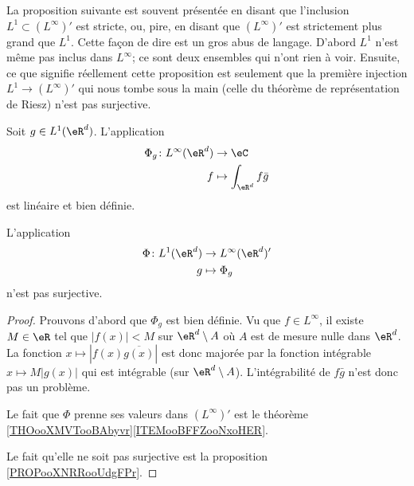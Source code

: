La proposition suivante est souvent présentée en disant que l'inclusion \( L^1\subset (L^{\infty})'\) est stricte, ou, pire, en disant que \( (L^{\infty})'\) est strictement plus grand que \( L^1\). Cette façon de dire est un gros abus de langage. D'abord \( L^1\) n'est même pas inclus dans \( L^{\infty}\); ce sont deux ensembles qui n'ont rien à voir. Ensuite, ce que signifie réellement cette proposition est seulement que la première injection \( L^1\to (L^{\infty})'\) qui nous tombe sous la main (celle du théorème de représentation de Riesz) n'est pas surjective.
\begin{proposition}     \label{PROPooXXRQooNSBZOi}
	Soit \( g\in L^1(\eR^d)\). L'application
	\begin{equation}
		\begin{aligned}
			\Phi_g\colon L^{\infty}(\eR^d) & \to \eC                     \\
			f                              & \mapsto \int_{\eR^d}f\bar g
		\end{aligned}
	\end{equation}
	est linéaire et bien définie.

	L'application
	\begin{equation}
		\begin{aligned}
			\Phi\colon L^1(\eR^d) & \to L^{\infty}(\eR^d)' \\
			g                     & \mapsto \Phi_g
		\end{aligned}
	\end{equation}
	n'est pas surjective.
\end{proposition}

\begin{proof}
	Prouvons d'abord que \( \Phi_g\) est bien définie. Vu que \( f\in L^{\infty}\), il existe \( M\in \eR\) tel que \( | f(x) |<M\) sur \( \eR^d\setminus A\) où \( A\) est de mesure nulle dans \( \eR^d\). La fonction \( x\mapsto| f(x)\overline{ g(x) } |\) est donc majorée par la fonction intégrable \( x\mapsto M| g(x) |\) qui est intégrable (sur \( \eR^d\setminus A\)). L'intégrabilité de \( f\bar g\) n'est donc pas un problème.

	Le fait que \( \Phi\) prenne ses valeurs dans \( (L^{\infty})'\) est le théorème \ref{THOooXMVTooBAbyvr}\ref{ITEMooBFFZooNxoHER}.

	Le fait qu'elle ne soit pas surjective est la proposition \ref{PROPooXNRRooUdgFPr}.
\end{proof}
